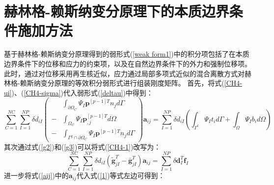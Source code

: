\section{赫林格-赖斯纳变分原理下的本质边界条件施加方法}
基于赫林格-赖斯纳变分原理得到的弱形式(\ref{weak form1})中的积分项包括了在本质边界条件下的位移和应力的约束项，以及在自然边界条件下的外力和强制位移项。
此时，通过对位移采用再生核近似，应力通过局部多项式近似的混合离散方式对赫林格-赖斯纳变分原理的等效积分弱形式进行组装刚度矩阵。
首先，将式(\ref{CH4-ui})、(\ref{CH4-sigma})代入弱形式(\ref{deltau})中得到：
\begin{equation}\label{CH4-1}
\sum_{C=1}^{N\!C}\sum_{I=1}^{N\!P}\delta d_{iI} \left (
        \begin{split}
        &\int_{\partial\Omega_C}\Psi_I\pmb{p}^{[p-1]T}n_jd\Gamma \\
        -&\int_{\Omega_C}\Psi_I\pmb{p}_{,j}^{[p-1]T}d\Omega \\
        -&\int_{\Gamma^g\cap\partial\Omega_C}\Psi_I\pmb{p}^{[p-1]T}n_jd\Gamma
        \end{split}
        \right )\pmb{a}_{ij}=
\sum_{I=1}^{N\!P}\delta d_{iI}(\int_{\Gamma^t}\Psi_It_id\Gamma+\int_{\Omega}\Psi_Ib_id\Omega)
\end{equation}
其次通过式(\ref{g2})和(\ref{g3})可以将式(\ref{CH4-1})改写为：
\begin{equation}\label{1}
    \sum_{C=1}^{N\!C}\sum_{I=1}^{N\!P}\delta d_{iI}(\tilde{\pmb g}_{jI}^T-\bar{\pmb g}_{jI}^T)\pmb{a}_{ij}=\sum_{I=1}^{N\!P}\delta\pmb{d}_I^T\pmb{f}_I
\end{equation}
进一步将式(\ref{aij})中的$\pmb{a}_{ij}$代入式(\ref{1})等式左边可得到：
\newpage
